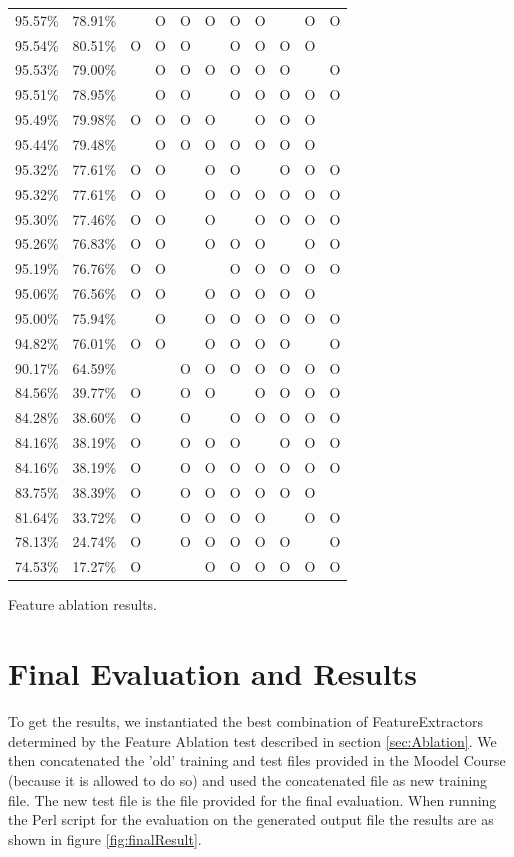 \documentclass[11pt, english]{article}
\begin{document}
\begin{landscape}
\begin{tabular}{ll|ccccccccc}
    95.57\% & 78.91\% &  & O & O & O & O & O &  & O & O\\
    95.54\% & 80.51\% & O & O & O &  & O & O & O & O & \\
    95.53\% & 79.00\% &  & O & O & O & O & O & O &  & O\\
    95.51\% & 78.95\% &  & O & O &  & O & O & O & O & O\\
    95.49\% & 79.98\% & O & O & O & O &  & O & O & O & \\
    95.44\% & 79.48\% &  & O & O & O & O & O & O & O & \\
    95.32\% & 77.61\% & O & O &  & O & O &  & O & O & O\\
    95.32\% & 77.61\% & O & O &  & O & O & O & O & O & O\\
    95.30\% & 77.46\% & O & O &  & O &  & O & O & O & O\\
    95.26\% & 76.83\% & O & O &  & O & O & O &  & O & O\\
    95.19\% & 76.76\% & O & O &  &  & O & O & O & O & O\\
    95.06\% & 76.56\% & O & O &  & O & O & O & O & O & \\
    95.00\% & 75.94\% &  & O &  & O & O & O & O & O & O\\
    94.82\% & 76.01\% & O & O &  & O & O & O & O &  & O\\
    90.17\% & 64.59\% &  &  & O & O & O & O & O & O & O\\
    84.56\% & 39.77\% & O &  & O & O &  & O & O & O & O\\
    84.28\% & 38.60\% & O &  & O &  & O & O & O & O & O\\
    84.16\% & 38.19\% & O &  & O & O & O &  & O & O & O\\
    84.16\% & 38.19\% & O &  & O & O & O & O & O & O & O\\
    83.75\% & 38.39\% & O &  & O & O & O & O & O & O & \\
    81.64\% & 33.72\% & O &  & O & O & O & O &  & O & O\\
    78.13\% & 24.74\% & O &  & O & O & O & O & O &  & O\\
    74.53\% & 17.27\% & O &  &  & O & O & O & O & O & O\\
  \end{tabular}
  \caption{Feature ablation results.}
  \label{tbl:results}
\end{landscape}


\section{Final Evaluation and Results}
To get the results, we instantiated the best combination of FeatureExtractors determined by the Feature Ablation test described in section \ref{sec:Ablation}. We then concatenated the 'old' training and test files provided in the Moodel Course (because it is allowed to do so) and used the concatenated file as new training file. The new test file is the file provided for the final evaluation. When running the Perl script for the evaluation on the generated output file the results are as shown in figure \ref{fig:finalResult}.
\end{document}

